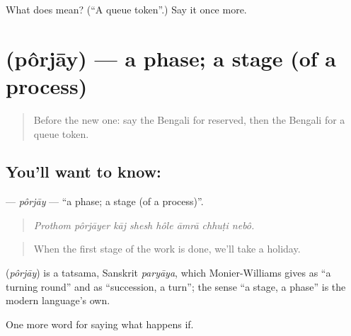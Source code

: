 \begin{tcolorbox}[breakable,colback=teal!4,colframe=teal!35!black,title={Before you move on}]
What does  mean? (\textquotedblleft{}A queue token\textquotedblright{}.) Say it once more.
\end{tcolorbox}
\section[\texorpdfstring{\bn{পর্যায়} (pôrjāy)}{পর্যায় (pôrjāy)}]{ (pôrjāy) — a phase; a stage (of a process)}

\label{lesson:BN-C541-porjay}



\begin{quote}
Before the new one: say the Bengali for reserved, then the Bengali for a queue token.
\end{quote}

\subsection*{You'll want to know: }
\textbf{} — \emph{pôrjāy} — \textquotedblleft{}a phase; a stage (of a process)\textquotedblright{}.

\begin{quote}
       
\end{quote}

\begin{quote}
\emph{Prothom pôrjāyer kāj shesh hôle āmrā chhuṭi nebô.}
\end{quote}

\begin{quote}
When the first stage of the work is done, we'll take a holiday.
\end{quote}

\begin{cousinweb}
\textbf{} (\emph{pôrjāy}) is a tatsama, Sanskrit \emph{paryāya}, which Monier-Williams gives as \textquotedblleft{}a turning round\textquotedblright{} and as \textquotedblleft{}succession, a turn\textquotedblright{}; the sense \textquotedblleft{}a stage, a phase\textquotedblright{} is the modern language's own.
\end{cousinweb}

\begin{grammarlens}[title={What you've built}]
One more word for saying what happens if.
\end{grammarlens}

